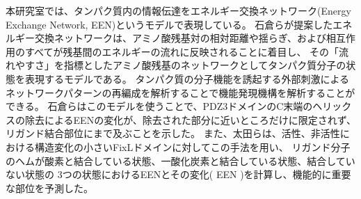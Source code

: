 本研究室では、タンパク質内の情報伝達をエネルギー交換ネットワーク(Energy Exchange Network, EEN)というモデルで表現している。
石倉らが提案したエネルギー交換ネットワークは、アミノ酸残基対の相対距離や揺らぎ、および相互作用のすべてが残基間のエネルギーの流れに反映されることに着目し、
その「流れやすさ」を指標としたアミノ酸残基のネットワークとしてタンパク質分子の状態を表現するモデルである。
タンパク質の分子機能を誘起する外部刺激によるネットワークパターンの再編成を解析することで機能発現機構を解析することができる。\autocite{ishikura_energy_2015}
石倉らはこのモデルを使うことで、PDZ3ドメインのC末端の\alpha ヘリックスの除去によるEENの変化が、除去された部分に近いところだけに限定されず、
リガンド結合部位にまで及ぶことを示した。\autocite{ishikura_energy_2015}
また、太田らは、活性、非活性における構造変化の小さいFixLドメインに対してこの手法を用い、
リガンド分子のヘムが酸素と結合している状態、一酸化炭素と結合している状態、結合していない状態の
3つの状態におけるEENとその変化( \Delta EEN )を計算し、機能的に重要な部位を予測した。\autocite{ota_energy_2019}
